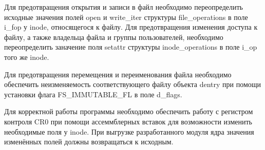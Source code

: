 Для предотвращения открытия и записи в файл необходимо переопределить исходные значения полей open и write\_iter структуры file\_operations в поле i\_fop у inode, относящегося к файлу.
Для предотвращения изменения доступа к файлу, а также владельца файла и группы пользователей, необходимо переопределить заначение поля setattr структуры inode\_operations в поле i\_op того же inode.

Для предотвращения перемещения и переименования файла необходимо обеспечить неизменяемость соответствующего файлу объекта dentry при помощи установки флага FS\_IMMUTABLE\_FL в поле d\_flags.

Для корректной работы программы необходимо обеспечить работу с регистром контроля CR0 при помощи ассеммблерных вставок для возможности изменить необходимые поля у inode. При выгрузке разработанного модуля ядра значения изменённых полей должны возвращаться к исходным.

